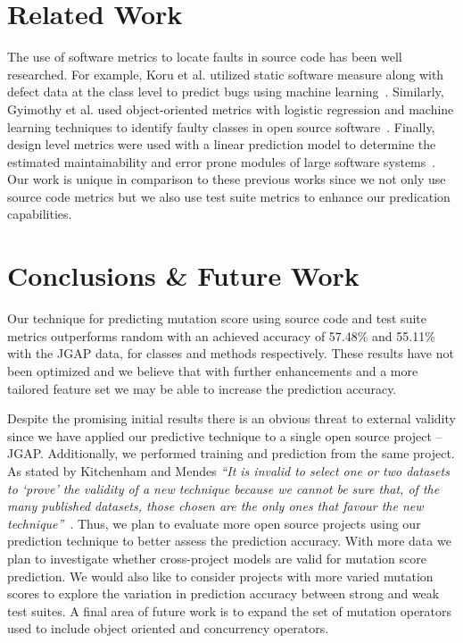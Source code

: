 \documentclass[conference]{IEEEtran}
\begin{document}
\section{Related Work}
\label{sec:related_work}
The use of software metrics to locate faults in source code has been well researched. For example, Koru et al. utilized static software measure along with defect data at the class level to predict bugs using machine learning~\cite{KL05}. Similarly, Gyimothy et al. used object-oriented metrics with logistic regression and machine learning techniques to identify faulty classes in open source software~\cite{GFS05}. Finally, design level metrics were used with a linear prediction model to determine the estimated maintainability and error prone modules of large software systems~\cite{MKPS00}. Our work is unique in comparison to these previous works since we not only use source code metrics but we also use test suite metrics to enhance our predication capabilities.


\section{Conclusions \& Future Work}
\label{sec:conclusions_future_work}
Our technique for predicting mutation score using source code and test suite metrics outperforms random with an achieved accuracy of 57.48\% and 55.11\% with the JGAP data, for classes and methods respectively. These results have not been optimized and we believe that with further enhancements and a more tailored feature set we may be able to increase the prediction accuracy.

Despite the promising initial results there is an obvious threat to external validity since we have applied our predictive technique to a single open source project -- JGAP. Additionally, we performed training and prediction from the same project. As stated by Kitchenham and Mendes \textit{``It is invalid to select one or two datasets to `prove' the validity of a new technique because we cannot be sure that, of the many published datasets, those chosen are the only ones that favour the new technique''}~\cite{KM09}. Thus, we plan to evaluate more open source projects using our prediction technique to better assess the prediction accuracy. With more data we plan to investigate whether cross-project models are valid for mutation score prediction. We would also like to consider projects with more varied mutation scores to explore the variation in prediction accuracy between strong and weak test suites. A final area of future work is to expand the set of mutation operators used to include object oriented and concurrency operators.




\end{document}
